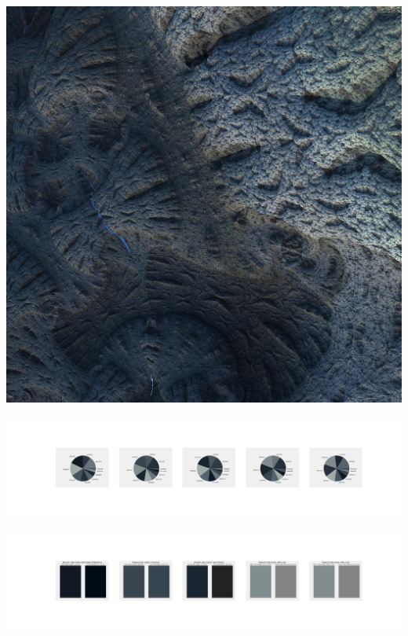 \documentclass[11pt]{article}
\begin{document}
\begin{landscape}
    \begin{center}
    \includegraphics[width=\textwidth]{./nbimg/file (326).jpg}
    \end{center}

    \begin{center}
    \includegraphics[width=250mm]{./nbimg/pie-252.jpg}
    \end{center}

    \begin{center}
    \includegraphics[width=250mm]{./nbimg/peak-252.jpg}
    \end{center}
    


\end{landscape}
\end{document}
